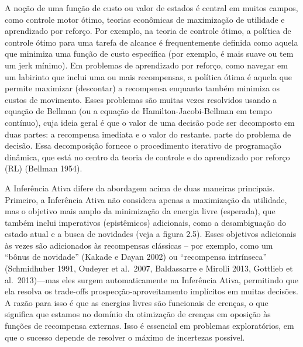 \documentclass[
  12pt,
]{book}
\begin{document}
A noção de uma função de custo ou valor de estados é central em muitos campos, como controle motor ótimo, teorias econômicas de maximização de utilidade e aprendizado por reforço. Por exemplo, na teoria de controle ótimo, a política de controle ótimo para uma tarefa de alcance é frequentemente definida como aquela que minimiza uma função de custo específica (por exemplo, é mais suave ou tem um jerk mínimo). Em problemas de aprendizado por reforço, como navegar em um labirinto que inclui uma ou mais recompensas, a política ótima é aquela que permite maximizar (descontar) a recompensa enquanto também minimiza os custos de movimento. Esses problemas são muitas vezes resolvidos usando a equação de Bellman (ou a equação de Hamilton-Jacobi-Bellman em tempo contínuo), cuja ideia geral é que o valor de uma decisão pode ser decomposto em duas partes: a recompensa imediata e o valor do restante. parte do problema de decisão. Essa decomposição fornece o procedimento iterativo de programação dinâmica, que está no centro da teoria de controle e do aprendizado por reforço (RL) (Bellman 1954).

A Inferência Ativa difere da abordagem acima de duas maneiras principais. Primeiro, a Inferência Ativa não considera apenas a maximização da utilidade, mas o objetivo mais amplo da minimização da energia livre (esperada), que também inclui imperativos (epistêmicos) adicionais, como a desambiguação do estado atual e a busca de novidades (veja a figura 2.5). Esses objetivos adicionais às vezes são adicionados às recompensas clássicas -- por exemplo, como um ``bônus de novidade'' (Kakade e Dayan 2002) ou ``recompensa intrínseca'' (Schmidhuber 1991, Oudeyer et al.~2007, Baldassarre e Mirolli 2013, Gottlieb et al.~2013)---mas eles surgem automaticamente na Inferência Ativa, permitindo que ela resolva os trade-offs prospecção-aproveitamento implícitos em muitas decisões. A razão para isso é que as energias livres são funcionais de crenças, o que significa que estamos no domínio da otimização de crenças em oposição às funções de recompensa externas. Isso é essencial em problemas exploratórios, em que o sucesso depende de resolver o máximo de incertezas possível.
\end{document}
